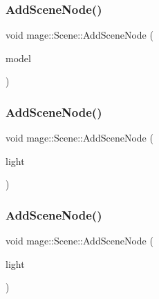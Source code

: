 \subsubsection{\texorpdfstring{Add\+Scene\+Node()}{AddSceneNode()}\hspace{0.1cm}{\footnotesize\ttfamily [2/7]}}
{\footnotesize\ttfamily void mage\+::\+Scene\+::\+Add\+Scene\+Node (\begin{DoxyParamCaption}\item[{\hyperlink{namespacemage_a1e01ae66713838a7a67d30e44c67703e}{Shared\+Ptr}$<$ \hyperlink{classmage_1_1_model_node}{Model\+Node} $>$}]{model }\end{DoxyParamCaption})\hspace{0.3cm}{\ttfamily [private]}}

\hypertarget{classmage_1_1_scene_a6d89db066e89a9a6eacc5e2568913c2b}{}\label{classmage_1_1_scene_a6d89db066e89a9a6eacc5e2568913c2b} 
\subsubsection{\texorpdfstring{Add\+Scene\+Node()}{AddSceneNode()}\hspace{0.1cm}{\footnotesize\ttfamily [3/7]}}
{\footnotesize\ttfamily void mage\+::\+Scene\+::\+Add\+Scene\+Node (\begin{DoxyParamCaption}\item[{\hyperlink{namespacemage_a1e01ae66713838a7a67d30e44c67703e}{Shared\+Ptr}$<$ \hyperlink{namespacemage_ab0783a7428706251f8561dc30a4d228d}{Ambient\+Light\+Node} $>$}]{light }\end{DoxyParamCaption})\hspace{0.3cm}{\ttfamily [private]}}

\hypertarget{classmage_1_1_scene_a92db81d9abcbc953a2beb4060b3b08da}{}\label{classmage_1_1_scene_a92db81d9abcbc953a2beb4060b3b08da} 
\subsubsection{\texorpdfstring{Add\+Scene\+Node()}{AddSceneNode()}\hspace{0.1cm}{\footnotesize\ttfamily [4/7]}}
{\footnotesize\ttfamily void mage\+::\+Scene\+::\+Add\+Scene\+Node (\begin{DoxyParamCaption}\item[{\hyperlink{namespacemage_a1e01ae66713838a7a67d30e44c67703e}{Shared\+Ptr}$<$ \hyperlink{namespacemage_a7637b5351fc0f66a10badd80ebb35899}{Directional\+Light\+Node} $>$}]{light }\end{DoxyParamCaption})\hspace{0.3cm}{\ttfamily [private]}}

